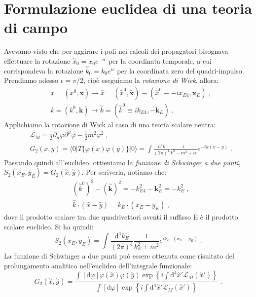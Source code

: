 \documentclass[12pt,a4paper]{article}
\theoremstyle{definition}
\newcommand{\lag}{\mathcal{L}}
\newcommand{\diff}[1][]{\mathrm{d}#1}
\newcommand{\bra}{\langle}
\newcommand{\ket}{\rangle}
\numberwithin{equation}{section}
\begin{document}
\section{Formulazione euclidea di una teoria di campo}
Avevamo visto che per aggirare i poli nei calcoli dei propagatori bisognava effettuare la rotazione $\stackrel{\sim}{x}_0=x_0e^{-i\epsilon}$ per la coordinata temporale, a cui corrispondeva la rotazione $\stackrel{\sim}{k}_0=k_0e^{i\epsilon}$ per la coordinata zero del quadri-impulso. Prendiamo adesso $\epsilon=\pi/2$, cioè eseguiamo la \emph{rotazione di Wick}, allora:
\begin{align*}
&x=(x^0,\mathbf{x})\longrightarrow \stackrel{\sim}{x}=(\stackrel{\sim}{x}^0,\stackrel{\sim}{\mathbf{x}})\equiv (\stackrel{\sim}{x}^0\equiv -ix_{E4},\mathbf{x}_E)\;, \\
&k=(k^0,\mathbf{k})\longrightarrow \stackrel{\sim}{k}=(\stackrel{\sim}{k}^0\equiv ik_{E4},-\mathbf{k}_E)\;.
\end{align*}
Applichiamo la rotazione di Wick al caso di una teoria scalare neutra:
\begin{align*}
&\lag_M=\frac{1}{2}\partial_{\mu}\varphi\partial^{\mu}\varphi-\frac{1}{2}m^2\varphi^2\;, \\
&G_2(x,y)=\bra 0|T\{\varphi(x)\varphi(y)\}|0\ket=\int\frac{\diff^4{k}}{(2\pi)^4}\frac{i}{k^2-m^2+i\epsilon}e^{-ik(x-y)}\;.
\end{align*}
Passando quindi all'euclideo, ottieniamo la \emph{funzione di Schwinger a due punti}, $S_2(x_E,y_E)=G_2(\stackrel{\sim}{x},\stackrel{\sim}{y})$. Per scriverla, notiamo che:
\begin{align*}
&\left(\stackrel{\sim}{k}^0\right)^2-\left(\stackrel{\sim}{\mathbf{k}}\right)^2=-k_{E4}^2-\mathbf{k}_E^2=-k_E^2\;, \\
&\stackrel{\sim}{k}\cdot(\stackrel{\sim}{x}-\stackrel{\sim}{y})=k_E\cdot(x_E-y_E)\;,
\end{align*}
dove il prodotto scalare tra due quadrivettori aventi il suffisso E è il prodotto scalare euclideo. Si ha quindi:
\begin{equation}
S_2(x_E,y_E)=\int\frac{\diff^4{k_E}}{(2\pi)^4}\frac{1}{k_E^2+m^2}e^{ik_E\cdot(x_E-y_E)}\;.
\end{equation}
La funzione di Schwinger a due punti può essere ottenuta come risultato del prolungamento analitico nell'euclideo dell'integrale funzionale:
$$
G_2(\stackrel{\sim}{x},\stackrel{\sim}{y})=\frac{\int[\diff{\varphi}]\varphi(\stackrel{\sim}{x})\varphi(\stackrel{\sim}{y})\exp\left\{i\int\diff^4{\stackrel{\sim}{x}'}\lag_M(\stackrel{\sim}{x}')\right\}}{\int[\diff{\varphi}]\exp\left\{i\int\diff^4{\stackrel{\sim}{x}'\lag_M(\stackrel{\sim}{x}')}\right\}}\;.
$$
\end{document}
